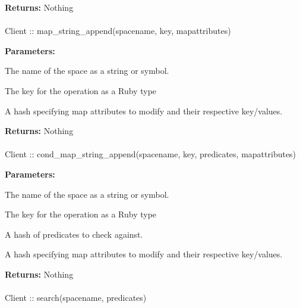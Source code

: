 \noindent\textbf{Returns:}
Nothing

\paragraph{}
\begin{ccode}
Client :: map_string_append(spacename, key, mapattributes)
\end{ccode}
\funcdesc 

\noindent\textbf{Parameters:}
\begin{description}[labelindent=\widthof{{mapattributes}},leftmargin=*,noitemsep,nolistsep,align=right]
\item[spacename] The name of the space as a string or symbol.
\item[key] The key for the operation as a Ruby type
\item[mapattributes] A hash specifying map attributes to modify and their respective key/values.
\end{description}

\noindent\textbf{Returns:}
Nothing

\paragraph{}
\begin{ccode}
Client :: cond_map_string_append(spacename, key, predicates, mapattributes)
\end{ccode}
\funcdesc 

\noindent\textbf{Parameters:}
\begin{description}[labelindent=\widthof{{mapattributes}},leftmargin=*,noitemsep,nolistsep,align=right]
\item[spacename] The name of the space as a string or symbol.
\item[key] The key for the operation as a Ruby type
\item[predicates] A hash of predicates to check against.
\item[mapattributes] A hash specifying map attributes to modify and their respective key/values.
\end{description}

\noindent\textbf{Returns:}
Nothing

\paragraph{}
\begin{ccode}
Client :: search(spacename, predicates)
\end{ccode}
\funcdesc 


